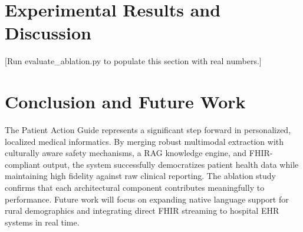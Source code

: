 \documentclass[conference]{IEEEtran}
\begin{document}
\section{Experimental Results and Discussion}
[Run evaluate\_ablation.py to populate this section with real numbers.]

\section{Conclusion and Future Work}
The Patient Action Guide represents a significant step forward in personalized, localized medical informatics. By merging robust multimodal extraction with culturally aware safety mechanisms, a RAG knowledge engine, and FHIR-compliant output, the system successfully democratizes patient health data while maintaining high fidelity against raw clinical reporting. The ablation study confirms that each architectural component contributes meaningfully to performance. Future work will focus on expanding native language support for rural demographics and integrating direct FHIR streaming to hospital EHR systems in real time.



\end{document}
